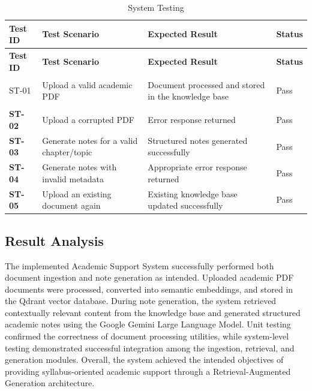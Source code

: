 \begin{xltabular}{\textwidth}{|>{\bfseries}p{3.5cm}|X|X|X|}
    \caption{System Testing} \\

        \hline
        \textbf{Test ID} & \textbf{Test Scenario} & \textbf{Expected Result} & \textbf{Status} \\
        \hline
        \endfirsthead

        \hline
        \textbf{Test ID} & \textbf{Test Scenario} & \textbf{Expected Result} & \textbf{Status} \\
        \hline
        \endhead
        
        ST-01 & Upload a valid academic PDF & Document processed and stored in the knowledge base & Pass \\
        \hline
        ST-02 & Upload a corrupted PDF & Error response returned & Pass \\
        \hline
        ST-03 & Generate notes for a valid chapter/topic & Structured notes generated successfully & Pass \\
        \hline
        ST-04 & Generate notes with invalid metadata & Appropriate error response returned & Pass \\
        \hline
        ST-05 & Upload an existing document again & Existing knowledge base updated successfully & Pass \\
        \hline
\end{xltabular}

\subsection{Result Analysis}
The implemented Academic Support System successfully performed both document ingestion and note generation as intended. Uploaded academic PDF documents were processed, converted into semantic embeddings, and stored in the Qdrant vector database. During note generation, the system retrieved contextually relevant content from the knowledge base and generated structured academic notes using the Google Gemini Large Language Model. Unit testing confirmed the correctness of document processing utilities, while system-level testing demonstrated successful integration among the ingestion, retrieval, and generation modules. Overall, the system achieved the intended objectives of providing syllabus-oriented academic support through a Retrieval-Augmented Generation architecture. \par